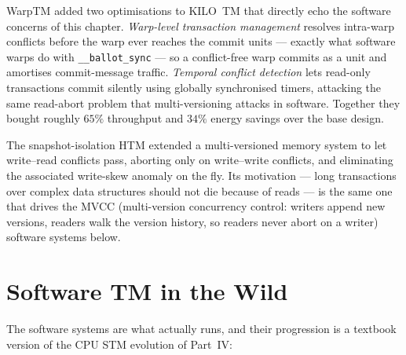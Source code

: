WarpTM \cite{fung13warptm} added two optimisations to KILO~TM that directly
echo the software concerns of this chapter. \emph{Warp-level transaction
management} resolves intra-warp conflicts before the warp ever reaches the
commit units --- exactly what software warps do with
\texttt{\_\_ballot\_sync} --- so a conflict-free warp commits as a unit and
amortises commit-message traffic. \emph{Temporal conflict detection} lets
read-only transactions commit silently using globally synchronised timers,
attacking the same read-abort problem that multi-versioning attacks in
software. Together they bought roughly $65\%$ throughput and $34\%$ energy
savings over the base design.

The snapshot-isolation HTM \cite{chen17snapshot} extended a multi-versioned
memory system to let write--read conflicts pass, aborting only on
write--write conflicts, and eliminating the associated write-skew anomaly on
the fly. Its motivation --- long transactions over complex data structures
should not die because of reads --- is the same one that drives the MVCC
(multi-version concurrency control: writers append new versions, readers walk
the version history, so readers never abort on a writer) software systems
below.

\section{Software TM in the Wild}
\label{sec:software}

The software systems are what actually runs, and their progression is a
textbook version of the CPU STM evolution of Part~IV:

